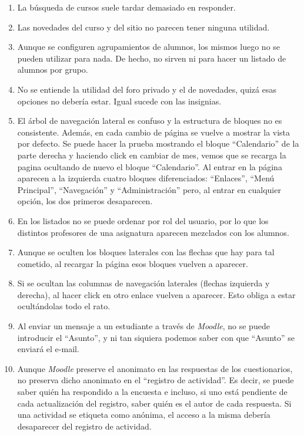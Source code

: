 \begin{enumerate}
\item La búsqueda de cursos suele tardar demasiado en responder.

\item Las novedades del curso y del sitio no parecen tener ninguna utilidad.

\item Aunque se configuren agrupamientos de alumnos, los mismos luego no se pueden utilizar para nada. De hecho, no sirven ni para hacer un listado de alumnos por grupo.

\item No se entiende la utilidad del foro privado y el de novedades, quizá esas opciones no debería estar. Igual sucede con las insignias.

\item El árbol de navegación lateral es confuso y la estructura de bloques no es consistente. Además, en cada cambio de página se vuelve a mostrar la vista por defecto. Se puede hacer la prueba mostrando el bloque ``Calendario'' de la parte derecha y haciendo click en cambiar de mes, vemos que se recarga la pagina ocultando de nuevo el bloque ``Calendario''. Al entrar en la página aparecen a la izquierda cuatro bloques diferenciados: ``Enlaces'', ``Menú Principal'', ``Navegación'' y ``Administración'' pero, al entrar en cualquier opción, los dos primeros desaparecen.

\item En los listados no se puede ordenar por rol del usuario, por lo que los distintos profesores de una asignatura aparecen mezclados con los alumnos.

\item Aunque se oculten los bloques laterales con las flechas que hay para tal cometido, al recargar la página esos bloques vuelven a aparecer.

\item Si se ocultan las columnas de navegación laterales (flechas izquierda y derecha), al hacer click en otro enlace vuelven a aparecer. Esto obliga a estar ocultándolas todo el rato.

\item Al enviar un mensaje a un estudiante a través de \textit{Moodle}, no se puede introducir el ``Asunto'', y ni tan siquiera podemos saber con que ``Asunto'' se enviará el e-mail.

\item Aunque \textit{Moodle} preserve el anonimato en las respuestas de los cuestionarios, no preserva dicho anonimato en el ``registro de actividad''. Es decir, se puede saber quién ha respondido a la encuesta e incluso, si uno está pendiente de cada actualización del registro, saber quién es el autor de cada respuesta. Si una actividad se etiqueta como anónima, el acceso a la misma debería desaparecer del registro de actividad.


\end{enumerate}
